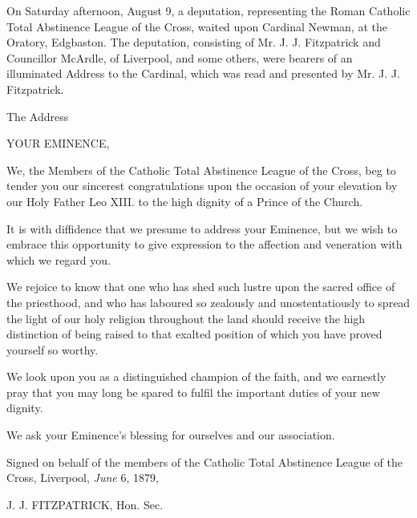 On Saturday afternoon, August 9, a deputation, representing the
Roman Catholic Total Abstinence League of the Cross, waited upon
Cardinal Newman, at the Oratory, Edgbaston. The deputation, consisting
of Mr. J. J. Fitzpatrick and Councillor McArdle, of Liverpool, and
some others, were bearers of an
illuminated Address to the Cardinal, which was read and presented by
Mr. J. J. Fitzpatrick.

The Address

YOUR EMINENCE,

We, the Members of the Catholic Total Abstinence League of the Cross,
beg to tender you our sincerest congratulations upon the occasion of
your elevation by our Holy Father Leo XIII. to the high dignity of a
Prince of the Church.

It is with diffidence that we presume to address your Eminence, but
we wish to embrace this opportunity to give expression to the
affection and veneration with which we regard you.

We rejoice to know that one who has shed such lustre upon the
sacred office of the priesthood, and who has laboured so zealously and
unostentatiously to spread the light of our holy religion throughout
the land should receive the high distinction of being raised to that
exalted position of which you have proved yourself so worthy.

We look upon you as a distinguished champion of the faith, and we
earnestly pray that you may long be spared to fulfil the important
duties of your new dignity.

We ask your Eminence's blessing for ourselves and our association.

Signed on behalf of the members of the Catholic Total Abstinence
League of the Cross, Liverpool, \emph{June} 6, 1879,

J. J. FITZPATRICK, Hon. Sec.



